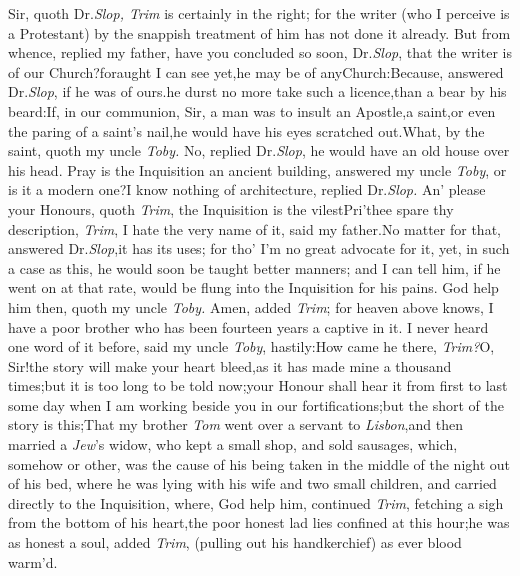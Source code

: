 \documentclass{article}
\begin{document}
Sir, quoth Dr.\@ \textit{Slop, Trim} is certainly in the right; for
the writer (who I perceive is a Protestant) by the snappish
treatment of him has not done it already. But
from whence, replied my father,\break
have you concluded so soon, Dr.\@ \textit{Slop},\break
that the writer is of our Church?\tsk for\break aught I
can see yet,\tsk he may be of any\break Church:\tsh Because,
answered Dr.\@ \textit{Slop}, if he was of ours.\tsk he durst no more
take such a licence,\tsk than a bear by his beard:\tsk If, in
our communion, Sir, a man was to insult an Apostle,\tsh a
saint,\tsh or even the paring of a saint’s
nail,\tsk he would have his eyes scratched out.\tsk What, by
the saint, quoth my
uncle \textit{Toby.} No, replied Dr.\@ \textit{Slop},\tsk
he would have an old house over his head. Pray is the Inquisition
an ancient building, answered my uncle \textit{Toby}, or is it a
modern one?\tsk I know nothing of architecture, replied
Dr.\@ \textit{Slop.}\tsh
An’ please your Honours, quoth \textit{Trim}, the Inquisition is the
vilest\tsh Pri’thee spare thy description, \textit{Trim}, I
hate the very name of it, said my father.\tsk No matter for that,
answered Dr.\@ \textit{Slop},\tsk it has its uses; for tho’
I’m no great advocate for it, yet, in such a case as this, he
would soon be taught better manners; and I can tell him, if he went
on at that rate, would be flung into the Inquisition for his pains.
God help him then, quoth my uncle \textit{Toby.} Amen, added
\textit{Trim}; for heaven above knows, I have a poor brother who has
been fourteen years a captive in it.\tsk\break
I never heard one word of it before, said
my uncle \textit{Toby}, hastily:\tsk How came he
there, \textit{Trim?}\tsh O, Sir!\@ the story will make your
heart bleed,\tsk as it has made mine a thousand times;\tsk but
it is too long to be told now;\tsk your Honour shall hear it from
first to last some day when I am working beside you in our
fortifications;\tsk but the short of the story is
this;\tsk That my brother \textit{Tom} went over a servant to
\textit{Lisbon},\tsk and then married a \textit{Jew}’s widow, who kept
a small shop, and sold sausages, which, somehow or other, was the cause of
his being taken in the middle of the night out of his bed, where he
was lying with his wife and two small children, and carried
directly to the Inquisition, where, God help him, continued
\textit{Trim}, fetching a sigh from the bottom of his
heart,\tsk the poor honest lad lies confined at this
hour;\tsh\break he was
as honest a soul, added \textit{Trim}, (pulling out his handkerchief)
as ever blood warm’d.\tsh
\end{document}
